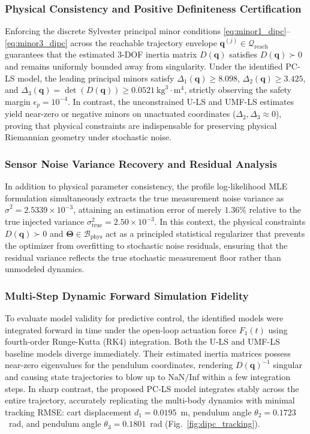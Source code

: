 \documentclass[lettersize,journal]{IEEEtran}
\begin{document}
\subsubsection{Physical Consistency and Positive Definiteness Certification}
Enforcing the discrete Sylvester principal minor conditions \eqref{eq:minor1_dipc}--\eqref{eq:minor3_dipc} across the reachable trajectory envelope $\bm{q}^{(j)} \in \mathcal{Q}_{\text{reach}}$ guarantees that the estimated 3-DOF inertia matrix $D(\bm{q})$ satisfies $D(\bm{q}) \succ 0$ and remains uniformly bounded away from singularity. Under the identified PC-LS model, the leading principal minors satisfy $\Delta_1(\bm{q}) \ge 8.098$, $\Delta_2(\bm{q}) \ge 3.425$, and $\Delta_3(\bm{q}) = \det(D(\bm{q})) \ge 0.0521~\text{kg}^3\cdot\text{m}^4$, strictly observing the safety margin $\epsilon_p = 10^{-4}$. In contrast, the unconstrained U-LS and UMF-LS estimates yield near-zero or negative minors on unactuated coordinates ($\Delta_2, \Delta_3 \approx 0$), proving that physical constraints are indispensable for preserving physical Riemannian geometry under stochastic noise.

\subsubsection{Sensor Noise Variance Recovery and Residual Analysis}
In addition to physical parameter consistency, the profile log-likelihood MLE formulation simultaneously extracts the true measurement noise variance as $\hat{\sigma}^2 = 2.5339 \times 10^{-3}$, attaining an estimation error of merely $1.36\%$ relative to the true injected variance $\sigma^2_{\text{true}} = 2.50 \times 10^{-3}$. In this context, the physical constraints $D(\bm{q}) \succ 0$ and $\bm{\Theta} \in \mathcal{B}_{\mathrm{phys}}$ act as a principled statistical regularizer that prevents the optimizer from overfitting to stochastic noise residuals, ensuring that the residual variance reflects the true stochastic measurement floor rather than unmodeled dynamics.

\subsubsection{Multi-Step Dynamic Forward Simulation Fidelity}
To evaluate model validity for predictive control, the identified models were integrated forward in time under the open-loop actuation force $F_1(t)$ using fourth-order Runge-Kutta (RK4) integration. Both the U-LS and UMF-LS baseline models diverge immediately. Their estimated inertia matrices possess near-zero eigenvalues for the pendulum coordinates, rendering $D(\bm{q})^{-1}$ singular and causing state trajectories to blow up to $\text{NaN}/\text{Inf}$ within a few integration steps. In sharp contrast, the proposed PC-LS model integrates stably across the entire trajectory, accurately replicating the multi-body dynamics with minimal tracking RMSE: cart displacement $d_1 = 0.0195$~m, pendulum angle $\theta_2 = 0.1723$~rad, and pendulum angle $\theta_3 = 0.1801$~rad (Fig.~\ref{fig:dipc_tracking}).
\end{document}
